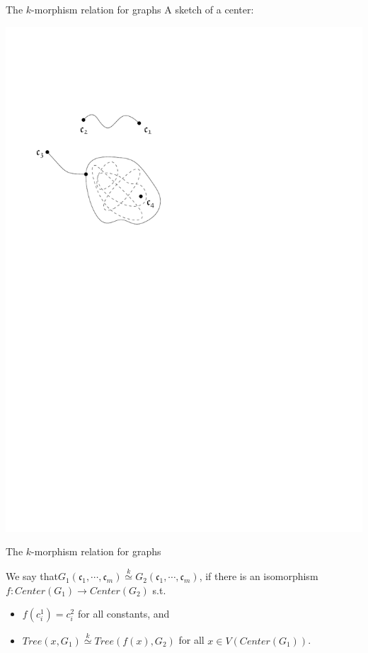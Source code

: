\documentclass[11pt]{beamer}
\newcommand{\clist}{\mathfrak{c}_{1}, \cdots, \mathfrak{c}_m}
\newcommand{\morph}[1]{\stackrel{#1}{\simeq}}
\begin{document}
		
	\begin{frame}{The $k$-morphism relation for graphs}
	A sketch of a center:
	\begin{center}
		\includegraphics[width=0.5\linewidth]{Center.pdf}
	\end{center}
	\end{frame}

	\begin{frame}{The $k$-morphism relation for graphs}
	\begin{definition} 
		We say that$G_1(\clist)\morph{k}G_2(\clist)$, if there is an isomorphism
		$f:Center(G_1)\rightarrow Center(G_2)$ s.t.
		\begin{itemize}
			\item $f(c^1_i)=c^2_i$ for all constants, and
			\item $Tree(x,G_1)\morph{k} Tree(f(x),G_2)$ for all $x\in V(Center(G_1))$.
		\end{itemize}
	\end{definition}
	
	\end{frame}
	
\end{document}
